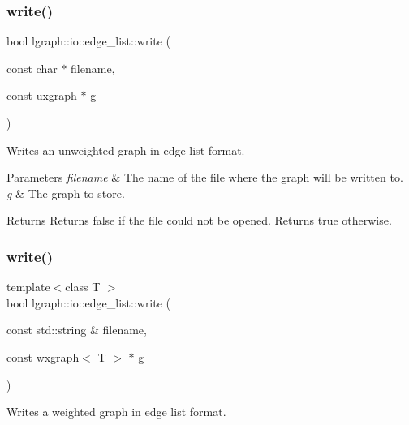 \subsubsection{\texorpdfstring{write()}{write()}\hspace{0.1cm}{\footnotesize\ttfamily [2/4]}}
{\footnotesize\ttfamily bool lgraph\+::io\+::edge\+\_\+list\+::write (\begin{DoxyParamCaption}\item[{const char $\ast$}]{filename,  }\item[{const \hyperlink{classlgraph_1_1uxgraph}{uxgraph} $\ast$}]{g }\end{DoxyParamCaption})}



Writes an unweighted graph in edge list format. 


\begin{DoxyParams}{Parameters}
{\em filename} & The name of the file where the graph will be written to. \\
\hline
{\em g} & The graph to store. \\
\hline
\end{DoxyParams}
\begin{DoxyReturn}{Returns}
Returns false if the file could not be opened. Returns true otherwise. 
\end{DoxyReturn}
\mbox{\label{namespacelgraph_1_1io_1_1edge__list_ae422e4d5062831a958585527065208e7}} 
\subsubsection{\texorpdfstring{write()}{write()}\hspace{0.1cm}{\footnotesize\ttfamily [3/4]}}
{\footnotesize\ttfamily template$<$class T $>$ \\
bool lgraph\+::io\+::edge\+\_\+list\+::write (\begin{DoxyParamCaption}\item[{const std\+::string \&}]{filename,  }\item[{const \hyperlink{classlgraph_1_1wxgraph}{wxgraph}$<$ T $>$ $\ast$}]{g }\end{DoxyParamCaption})}



Writes a weighted graph in edge list format. 


